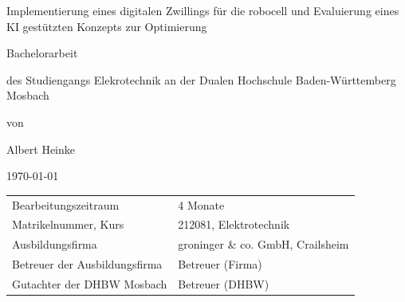 \begin{titlepage}

\begin{singlespace}
    




\vspace{1cm}
\centering
\fontsize{30}{27} \selectfont Implementierung eines digitalen Zwillings für die robocell und Evaluierung eines KI gestützten Konzepts zur Optimierung  
 \par
\vspace{1.5cm}
\fontsize{36}{33} \selectfont Bachelorarbeit \par
\vspace{1.5cm}
\fontsize{16}{20} \selectfont  des Studiengangs Elekrotechnik
an der Dualen Hochschule Baden-Württemberg Mosbach
\vspace{1.5cm}

\fontsize{18}{22} \selectfont von \par
\fontsize{20}{25} \selectfont Albert Heinke\par
\vspace{1.5cm}
\fontsize{18}{22} \selectfont \today \par
\vfill

\fontsize{13}{18} \selectfont
\begin{tabular}{ l  l }
  Bearbeitungszeitraum & \hspace{0.85cm} 4 Monate \\
  Matrikelnummer, Kurs & \hspace{0.85cm} 212081, Elektrotechnik \\
  Ausbildungsfirma & \hspace{0.85cm} groninger \& co. GmbH, Crailsheim \\
  Betreuer der Ausbildungsfirma & \hspace{0.85cm} Betreuer (Firma) \\
  Gutachter der DHBW Mosbach & \hspace{0.85cm} Betreuer (DHBW) \\
\end{tabular}


\end{singlespace}
\end{titlepage}
